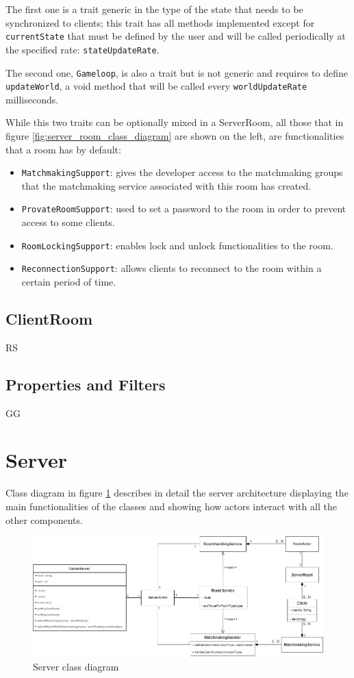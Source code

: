The first one is a trait generic in the type of the state that needs to be synchronized to clients; this trait has all methods implemented except for \texttt{currentState} that must be defined by the user and will be called periodically at the specified rate: \texttt{stateUpdateRate}.

The second one, \texttt{Gameloop}, is also a trait but is not generic and requires to define \texttt{updateWorld}, a void method that will be called every \texttt{worldUpdateRate} milliseconds.

While this two traits can be optionally mixed in a ServerRoom, all those that in figure \ref{fig:server_room_class_diagram} are shown on the left, are functionalities that a room has by default:
\begin{itemize}
	\item \texttt{MatchmakingSupport}: gives the developer access to the matchmaking groups that the matchmaking service associated with this room has created.
	\item \texttt{ProvateRoomSupport}: used to set a password to the room in order to prevent access to some clients.
	\item \texttt{RoomLockingSupport}: enables lock and unlock functionalities to the room. 
	\item \texttt{ReconnectionSupport}: allows clients to reconnect to the room within a certain period of time.
\end{itemize}

\subsection{ClientRoom}

RS

\subsection{Properties and Filters}

GG

\section{Server}
Class diagram in figure \ref{fig:server_class_diagram} describes in detail the server architecture displaying the main functionalities of the classes and showing how actors interact with all the other components. 
\begin{figure}[h]
	\hspace*{-1.1in}
	\includegraphics[scale=0.55]{images/4-design/server_class.png}
	\caption{Server class diagram}
	\label{fig:server_class_diagram}
\end{figure}

